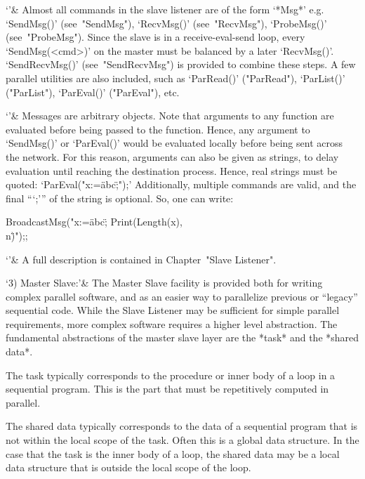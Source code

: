 `'&
    Almost all commands in the slave listener are  of  the  form  `*Msg*'
    e.g.  `SendMsg()'   (see~"SendMsg"),   `RecvMsg()'   (see~"RecvMsg"),
    `ProbeMsg()'   (see~"ProbeMsg").   Since   the   slave   is   in    a
    receive-eval-send loop, every `SendMsg(<cmd>)' on the master must  be
    balanced by a later `RecvMsg()'. `SendRecvMsg()'  (see~"SendRecvMsg")
    is provided to combine these steps. A few parallel utilities are also
    included, such as `ParRead()' ("ParRead"),  `ParList()'  ("ParList"),
    `ParEval()' ("ParEval"), etc.

`'& Messages are arbitrary {\GAP} objects. Note  that  arguments  to  any
    {\GAP} function are evaluated before being passed  to  the  function.
    Hence, any argument to `SendMsg()' or `ParEval()' would be  evaluated
    locally before being  sent  across  the  network.  For  this  reason,
    arguments can also be given as strings,  to  delay  evaluation  until
    reaching the destination process. Hence, real strings must be quoted:
    `ParEval("x:=\"abc\";");' Additionally, multiple commands are  valid,
    and the final ```;''' of the string is optional. So, one can write:

\begintt
BroadcastMsg("x:=\"abc\"; Print(Length(x), \"\\n\")");;
\endtt

`'& A full description is contained in Chapter~"Slave Listener".

`3) Master Slave:'&
    The Master Slave  facility  is  provided  both  for  writing  complex
    parallel software, and as an easier way to  parallelize  previous  or
    ``legacy''  sequential  code.  While  the  Slave  Listener   may   be
    sufficient for simple parallel requirements,  more  complex  software
    requires a higher level abstraction. The fundamental abstractions  of
    the master slave layer are the *task* and the *shared data*.

\beginlist
{}
    The task typically corresponds to the procedure or inner  body  of  a
    loop in  a  sequential  program.  This  is  the  part  that  must  be
    repetitively computed in parallel.

    The shared data typically corresponds to the  data  of  a  sequential
    program that is not within the local scope of the task. Often this is
    a global data structure. In the case that the task is the inner  body
    of a loop, the shared data may be a  local  data  structure  that  is
    outside the local scope of the loop.
\endlist


